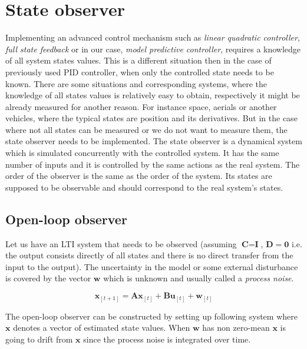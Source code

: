 \section{State observer}

Implementing an advanced control mechanism such as \textit{linear quadratic controller}, \textit{full state feedback} or in our case, \textit{model predictive controller}, requires a knowledge of all system states values. This is a different situation then in the case of previously used PID controller, when only the controlled state needs to be known. There are some situations and corresponding systems, where the knowledge of all states values is relatively easy to obtain, respectively it might be already measured for another reason. For instance space, aerials or another vehicles, where the typical states are position and its derivatives. But in the case where not all states can be measured or we do not want to measure them, the state observer needs to be implemented. The state observer is a dynamical system which is simulated concurrently with the controlled system. It has the same number of inputs and it is controlled by the same actions as the real system. The order of the observer is the same as the order of the system. Its states are supposed to be observable and should correspond to the real system's states.

\subsection{Open-loop observer}

Let us have an LTI system that needs to be observed (assuming $\textbf{C} = \textbf{I}$, $\textbf{D} = \mathbf{0}$ i.e. the output consists directly of all states and there is no direct transfer from the input to the output). The uncertainty in the model or some external disturbance is covered by the vector $\textbf{w}$ which is unknown and usually called a \emph{process noise}.

\begin{equation}
\textbf{x}_{[t+1]} = \textbf{A}\textbf{x}_{[t]} + \textbf{B}\textbf{u}_{[t]} + \textbf{w}_{[t]}
\end{equation}

The open-loop observer can be constructed by setting up following system where $\textbf{\^x}$ denotes a vector of estimated state values. When $\textbf{w}$ has non zero-mean $\textbf{\^x}$ is going to drift from $\textbf{x}$ since the process noise is integrated over time.

